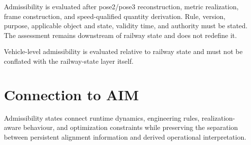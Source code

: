 Admissibility is evaluated after pose2/pose3 reconstruction, metric
realization, frame construction, and speed-qualified quantity derivation.
Rule, version, purpose, applicable object and state, validity time, and
authority must be stated. The assessment remains downstream of railway state
and does not redefine it.

Vehicle-level admissibility is evaluated relative to railway state and
must not be conflated with the railway-state layer itself.

\section{Connection to AIM}

\begin{summary}
Admissibility states connect runtime dynamics, engineering rules,
realization-aware behaviour, and optimization constraints while
preserving the separation between persistent alignment information and
derived operational interpretation.
\end{summary}
